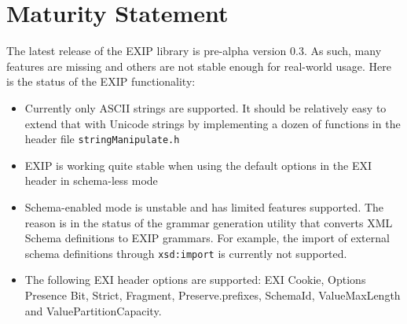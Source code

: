 \section{Maturity Statement}
\label{sec:Maturity-Statement}

The latest release of the EXIP library is pre-alpha version 0.3. As such, 
many features are missing and others are not stable enough for real-world
usage. Here is the status of the EXIP functionality:

\begin{itemize}
 \item Currently only ASCII strings are supported. It should be relatively easy to extend
that with Unicode strings by implementing a dozen of functions in the header
file \texttt{stringManipulate.h}
 \item EXIP is working quite stable when using the default options in the EXI header in schema-less mode
 \item Schema-enabled mode is unstable and has limited features supported. The reason is in the
status of the grammar generation utility that converts XML Schema definitions to EXIP grammars.
For example, the import of external schema definitions through \texttt{xsd:import} is currently not supported.
 \item The following EXI header options are supported: EXI Cookie, Options Presence Bit, Strict, Fragment,
Preserve.prefixes, SchemaId, ValueMaxLength and ValuePartitionCapacity.
\end{itemize}
